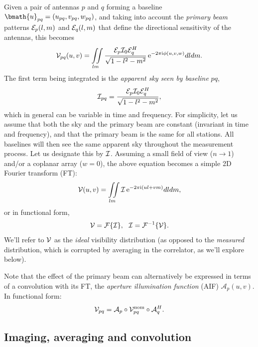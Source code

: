 \documentclass[useAMS,usenatbib]{mn2e}
\newcommand{\ee}{\mathrm{e}}
\newcommand{\ii}{\mathrm{i}}
\begin{document}
Given a pair of antennas $p$ and $q$ forming a baseline $\bmath{u}_{pq}=(u_{pq},v_{pq},w_{pq})$, 
and taking into account the \emph{primary beam} patterns $\mathcal{E}_p(l,m)$ and $\mathcal{E}_q(l,m)$ that define the directional sensitivity of 
the antennas, this becomes 
\begin{equation}
\VV_{pq}(u,v)=\iint\limits_{lm} \frac{\EE_p \II_0 \EE_q^H}{\sqrt{1-l^2 - m^2}}\,\ee^{-2\pi\ii\phi (u,v,w)}dldm. \label{eq:visSky}
\end{equation}
The first term being integrated is the \emph{apparent sky seen by baseline} $pq$,
\begin{equation}
\mathcal{I}_{pq} = \frac{\mathcal{E}_p \mathcal{I}_0 \mathcal{E}_q^H}{\sqrt{1-l^2 - m^2}},
\end{equation} 
which in general can be variable in time and frequency. 
For simplicity, let us assume that both the sky and the primary beam are constant (invariant in time and frequency), and that the primary beam is the same for all stations. All baselines will then see the same apparent sky throughout the measurement process. Let us designate this by $\mathcal{I}$. Assuming a small field of view ($n\to 1$) and/or a coplanar array ($w=0$), the above equation becomes a simple 2D Fourier transform (FT):
\begin{equation}
\VV(u,v)=\iint\limits_{lm} \II\,\ee^{-2\pi\ii(ul+vm)}dldm, \label{eq:visSky:2D}
\end{equation} 
or in functional form,
\begin{equation}
\mathcal{V}=\mathcal{F}\{\mathcal{I}\},~~\mathcal{I}=\mathcal{F}^{-1}\{\mathcal{V}\}.
\end{equation}
We'll refer to $\mathcal{V}$ as the \emph{ideal} visibility distribution (as opposed
to the \emph{measured} distribution, which is corrupted by averaging in the correlator, as we'll explore below).

Note that the effect of the primary beam can alternatively be expressed in terms of a convolution with its FT, the \emph{aperture 
illumination function} (AIF) $\mathcal{A}_p(u,v)$. In functional form:
\begin{equation}
\mathcal{V}_{pq} = \mathcal{A}_p \circ \mathcal{V}^\mathrm{nom}_{pq} \circ \mathcal{A}_q^H.\label{eq:visSky:conv}
\end{equation} 

\subsection{Imaging, averaging and convolution}
\end{document}

